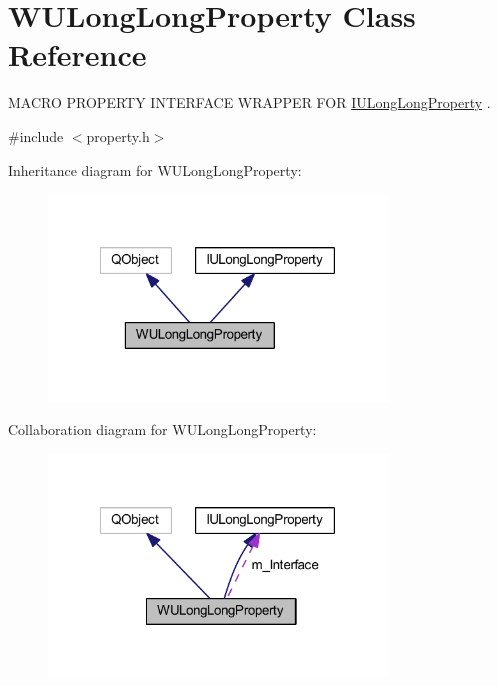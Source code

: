 \hypertarget{class_w_u_long_long_property}{\section{W\-U\-Long\-Long\-Property Class Reference}
\label{class_w_u_long_long_property}
}


M\-A\-C\-R\-O P\-R\-O\-P\-E\-R\-T\-Y I\-N\-T\-E\-R\-F\-A\-C\-E W\-R\-A\-P\-P\-E\-R F\-O\-R \hyperlink{class_i_u_long_long_property}{I\-U\-Long\-Long\-Property} .  




{\ttfamily \#include $<$property.\-h$>$}



Inheritance diagram for W\-U\-Long\-Long\-Property\-:
\nopagebreak
\begin{figure}[H]
\begin{center}
\leavevmode
\includegraphics[width=255pt]{class_w_u_long_long_property__inherit__graph}
\end{center}
\end{figure}


Collaboration diagram for W\-U\-Long\-Long\-Property\-:
\nopagebreak
\begin{figure}[H]
\begin{center}
\leavevmode
\includegraphics[width=255pt]{class_w_u_long_long_property__coll__graph}
\end{center}
\end{figure}
